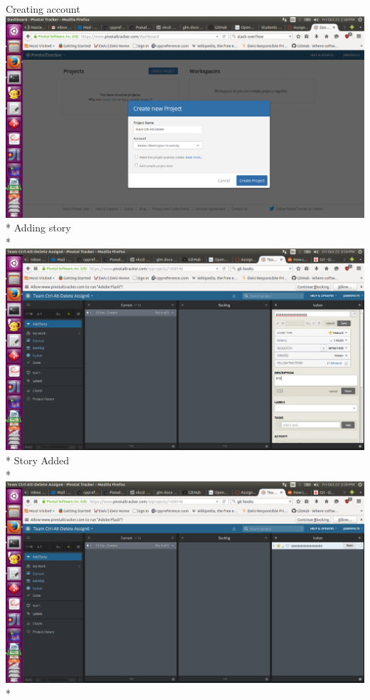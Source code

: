 \documentclass{article}
\begin{document}
Creating account\newline
\includegraphics[scale=.3]{Screenshot from 2015-10-23 14-50-09.png}\\*
Adding story\\*
\includegraphics[scale=.3]{Screenshot from 2015-10-23 15-54-43.png}\\*
\newpage Story Added\\*
\includegraphics[scale=.3]{Screenshot from 2015-10-23 15-59-5.png}\\*
\end{document}
